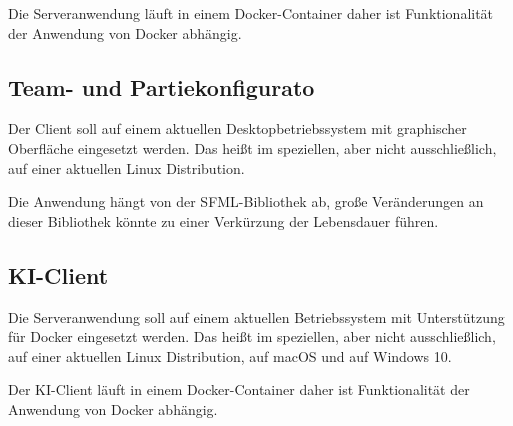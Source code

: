 Die Serveranwendung läuft in einem Docker-Container daher ist Funktionalität der Anwendung von Docker abhängig.

\subsection{Team- und Partiekonfigurato}
Der Client soll auf einem aktuellen Desktopbetriebssystem mit graphischer Oberfläche eingesetzt werden. Das heißt im speziellen, aber nicht ausschließlich, auf einer aktuellen Linux Distribution.

Die Anwendung hängt von der SFML-Bibliothek ab, große Veränderungen an dieser Bibliothek könnte zu einer Verkürzung der Lebensdauer führen.

\subsection{KI-Client}
Die Serveranwendung soll auf einem aktuellen Betriebssystem mit Unterstützung für Docker eingesetzt werden. Das heißt im speziellen, aber nicht ausschließlich, auf einer aktuellen Linux Distribution, auf macOS und auf Windows 10.

Der KI-Client läuft in einem Docker-Container daher ist Funktionalität der Anwendung von Docker abhängig.
